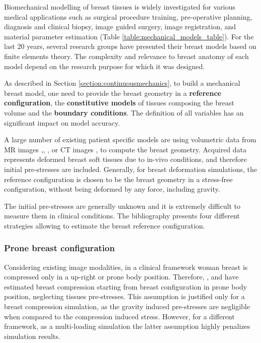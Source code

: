 
Biomechanical modelling of breast tissues is widely investigated for various medical applications such as surgical procedure training, pre-operative planning, diagnosis and clinical biopsy, image guided surgery, image registration, and material parameter estimation (Table \ref{table:mechanical_models_table}). For the last 20 years, several research groups have presented their breast models based on finite elements theory.  The complexity and relevance to breast anatomy of each model depend on the research purpose for which it was designed. 
 
As described in Section \ref{section:continuousmechanics}, to build a mechanical breast model, one need to provide the breast geometry in a \textbf{reference configuration}, the \textbf{constitutive models} of tissues composing the breast volume and the \textbf{boundary conditions}. The definition of all variables has an significant impact on model accuracy.


A large number of existing patient specific models are using volumetric data from MR images \cite{carter_biomechanical_2009},\cite{kellner_simulation_2007}, \cite{conley_realization_2015} \cite{eiben_symmetric_2016}, \cite{martinez_finite_2017}  or CT images \cite{palomar_finite_2008},\cite{sturgeon_finite_element_2016} to compute the breast geometry. Acquired data represents deformed breast soft tissues due to in-vivo conditions, and therefore initial pre-stresses are included. Generally, for breast deformation simulations, the reference configuration is chosen to be the breast geometry in a stress-free configuration, without being deformed by any force, including gravity.

The initial pre-stresses are generally unknown and it is extremely difficult to measure them in clinical conditions. The bibliography presents four different strategies allowing to estimate the breast reference configuration.

 \subsubsection*{Prone breast configuration}
 Considering existing image modalities, in a clinical framework woman breast is compressed only in a up-right or prone body position. Therefore, \cite{han_development_2012}, \cite{ruiter_model_based_2006} and \cite{sturgeon_finite_element_2016} have estimated breast compression starting from breast configuration in prone body position, neglecting tissues pre-stresses. This assumption is justified only for a breast compression simulation, as the gravity induced pre-stresses are negligible when compared to the compression induced stress. However, for a different framework, as a multi-loading simulation the latter assumption highly penalizes simulation results. 
